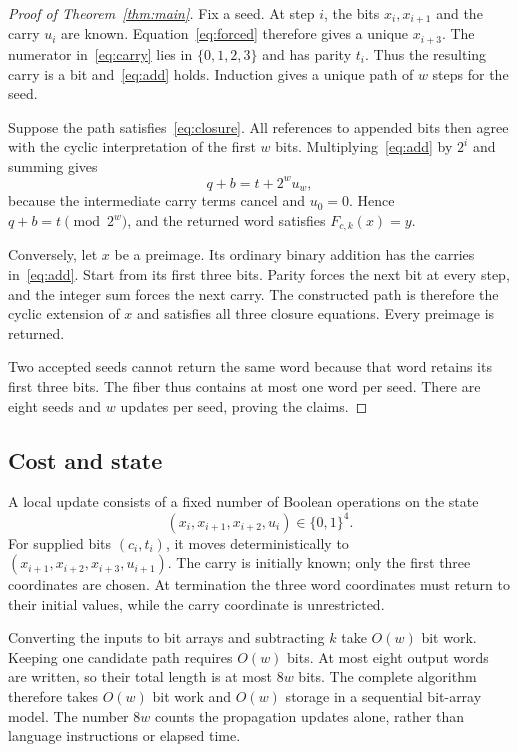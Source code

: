 \documentclass[11pt,a4paper]{article}
\newcommand{\B}{\{0,1\}}
\begin{document}
\begin{proof}[Proof of Theorem~\ref{thm:main}]
Fix a seed. At step $i$, the bits $x_i,x_{i+1}$ and the carry $u_i$ are known. Equation~\eqref{eq:forced} therefore gives a unique $x_{i+3}$. The numerator in~\eqref{eq:carry} lies in $\{0,1,2,3\}$ and has parity $t_i$. Thus the resulting carry is a bit and~\eqref{eq:add} holds. Induction gives a unique path of $w$ steps for the seed.

Suppose the path satisfies~\eqref{eq:closure}. All references to appended bits then agree with the cyclic interpretation of the first $w$ bits. Multiplying~\eqref{eq:add} by $2^i$ and summing gives
\[
 q+b=t+2^wu_w,
\]
because the intermediate carry terms cancel and $u_0=0$. Hence $q+b=t\pmod{2^w}$, and the returned word satisfies $F_{c,k}(x)=y$.

Conversely, let $x$ be a preimage. Its ordinary binary addition has the carries in~\eqref{eq:add}. Start from its first three bits. Parity forces the next bit at every step, and the integer sum forces the next carry. The constructed path is therefore the cyclic extension of $x$ and satisfies all three closure equations. Every preimage is returned.

Two accepted seeds cannot return the same word because that word retains its first three bits. The fiber thus contains at most one word per seed. There are eight seeds and $w$ updates per seed, proving the claims.
\end{proof}

\subsection{Cost and state}
A local update consists of a fixed number of Boolean operations on the state
\[
 (x_i,x_{i+1},x_{i+2},u_i)\in\B^4.
\]
For supplied bits $(c_i,t_i)$, it moves deterministically to
$(x_{i+1},x_{i+2},x_{i+3},u_{i+1})$.
The carry is initially known; only the first three coordinates are chosen.
At termination the three word coordinates must return to their initial values,
while the carry coordinate is unrestricted.

Converting the inputs to bit arrays and subtracting $k$ take $O(w)$ bit work. Keeping one candidate path requires $O(w)$ bits. At most eight output words are written, so their total length is at most $8w$ bits. The complete algorithm therefore takes $O(w)$ bit work and $O(w)$ storage in a sequential bit-array model. The number $8w$ counts the propagation updates alone, rather than language instructions or elapsed time.
\end{document}
